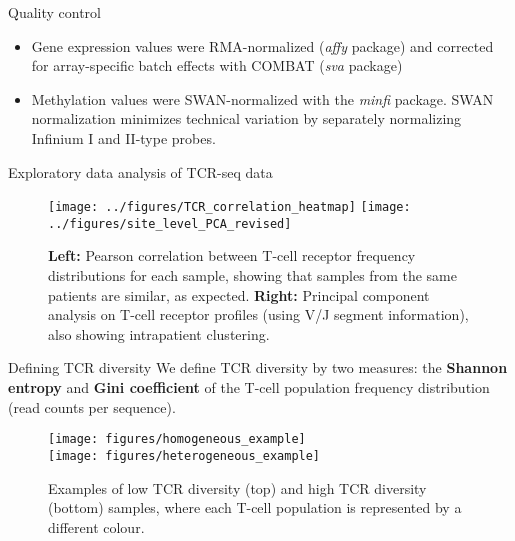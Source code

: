 \documentclass[serif,mathserif,final,dvipsnames]{beamer}
\begin{document}
\begin{frame}{}
\begin{columns}[t]
\begin{column}{0.32\linewidth}
      \begin{myblock}{Quality control}
      \begin{itemize}
      \item Gene expression values were RMA-normalized (\emph{affy} package) and corrected for array-specific batch effects with COMBAT (\emph{sva} package)
      \end{itemize}
      \begin{itemize}
	\item Methylation values were SWAN-normalized with the \emph{minfi} package.  SWAN normalization minimizes technical variation by separately normalizing Infinium I and II-type probes. 
      \end{itemize}
      \end{myblock}
    \begin{myblock}{Exploratory data analysis of TCR-seq data}
      \begin{figure}[htb]
          \centering
          \texttt{[image: ../figures/TCR\_correlation\_heatmap]}
          \texttt{[image: ../figures/site\_level\_PCA\_revised]}
          \caption{\textbf{Left:} Pearson correlation between T-cell receptor frequency distributions for each sample, showing that samples from the same patients are similar, as expected. \textbf{Right:} Principal component analysis on T-cell receptor profiles (using V/J segment information), also showing intrapatient clustering.}
        \end{figure}
      \end{myblock}
      
      \begin{myblock}{Defining TCR diversity}
      We define TCR diversity by two measures: the \textbf{Shannon entropy} and \textbf{Gini coefficient} of the T-cell population frequency distribution (read counts per sequence). 
      \begin{figure}[htb]
          \centering
          \texttt{[image: figures/homogeneous\_example]}\\
          \texttt{[image: figures/heterogeneous\_example]}
          \caption{Examples of low TCR diversity (top) and high TCR diversity (bottom) samples, where each T-cell population is represented by a different colour.}
        \end{figure}
      \end{myblock}

    \end{column}%


\end{columns}
\end{frame}
\end{document}
